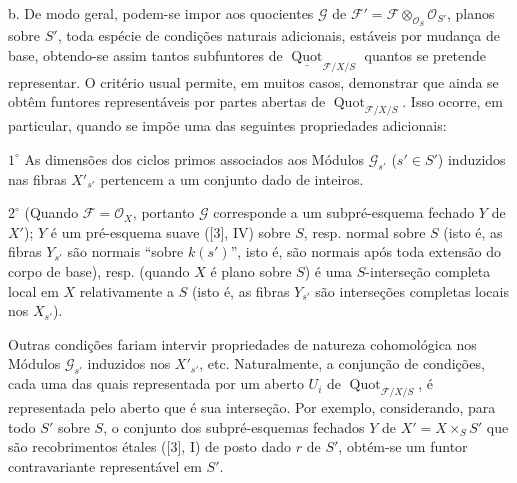 \medskip
\noindent b. De modo geral, podem-se impor aos quocientes $\mathcal G$ de
$\mathcal F'=\mathcal F\otimes_{\mathcal O_S}\mathcal O_{S'}$, planos sobre
$S'$, toda espécie de condições naturais adicionais, estáveis por mudança de
base, obtendo-se assim tantos subfuntores de
$\underline{\operatorname{Quot}}_{\mathcal F/X/S}$ quantos se pretende
representar. O critério usual permite, em muitos casos, demonstrar que ainda se
obtêm funtores representáveis por partes abertas de
$\operatorname{Quot}_{\mathcal F/X/S}$. Isso ocorre, em particular, quando se
impõe uma das seguintes propriedades adicionais:

\smallskip
\noindent $1^\circ$ As dimensões dos ciclos primos associados aos Módulos
$\mathcal G_{s'}$ ($s'\in S'$) induzidos nas fibras $X'_{s'}$ pertencem a um
conjunto dado de inteiros.

\smallskip
\noindent $2^\circ$ (Quando $\mathcal F=\mathcal O_X$, portanto $\mathcal G$
corresponde a um subpré-esquema fechado $Y$ de $X'$); $Y$ é um pré-esquema
suave ([3], IV) sobre $S$, resp. normal sobre $S$ (isto é, as fibras $Y_{s'}$
são normais ``sobre $k(s')$'', isto é, são normais após toda extensão do corpo
de base), resp. (quando $X$ é plano sobre $S$) é uma $S$-interseção completa
local em $X$ relativamente a $S$ (isto é, as fibras $Y_{s'}$ são interseções
completas locais nos $X_{s'}$).

Outras condições fariam intervir propriedades de natureza cohomológica nos
Módulos $\mathcal G_{s'}$ induzidos nos $X'_{s'}$, etc. Naturalmente, a
conjunção de condições, cada uma das quais representada por um aberto $U_i$ de
$\operatorname{Quot}_{\mathcal F/X/S}$, é representada pelo aberto que é sua
interseção. Por exemplo, considerando, para todo $S'$ sobre $S$, o conjunto dos
subpré-esquemas fechados $Y$ de $X'=X\times_SS'$ que são recobrimentos étales
([3], I) de posto dado $r$ de $S'$, obtém-se um funtor contravariante
representável em $S'$.

